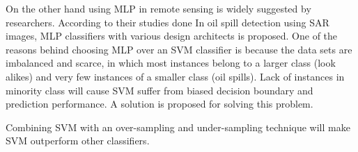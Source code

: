 On the other hand using MLP in remote sensing is widely suggested by researchers\cite{Mera201472,Brekke200595,fingas2014review}. According to their studies done In oil spill detection using SAR images, MLP classifiers with various design architects is proposed. One of the reasons behind choosing MLP over an SVM classifier is because the data sets are imbalanced and scarce, in which most instances belong to a larger class (look alikes) and very few instances of a smaller class (oil spills). Lack of instances in minority class will cause SVM suffer from biased decision boundary and prediction performance. A solution is proposed for solving this problem. 

Combining SVM with an over-sampling and under-sampling technique will make SVM outperform other classifiers\cite{liu2006boosting}.


